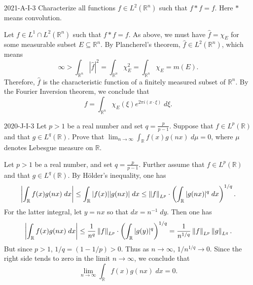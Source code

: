 \documentclass{article}
\begin{document}
	
	\begin{prb}{2021-A-I-3}
		Characterize all functions $f \in L^2(\mathbb{R}^n)$ such that $f \ast f= f$. Here $\ast$ means convolution. 
	\end{prb}
	Let $f \in L^1 \cap L^2(\mathbb{R}^n)$ such that $f \ast f = f$. As above, we must have $\hat{f} = \chi_E$ for some measurable subset $E \subseteq\mathbb{R}^n$. By Plancherel's theorem, $\hat{f} \in L^2(\mathbb{R}^n)$, which means 
	\begin{equation*}
		\infty > \int_{\mathbb{R}^n}|\hat{f}|^2 = \int_{\mathbb{R}^n}\chi_E^2 = \int_{\mathbb{R}^n}\chi_E = m(E). 
	\end{equation*}
	Therefore, $\hat{f}$ is the characteristic function of a finitely measured subset of $\mathbb{R}^n$. By the Fourier Inversion theorem, we conclude that
	\begin{equation*}
		f = \int_{\mathbb{R}^n}\chi_E(\xi)e^{2\pi i (x \cdot \xi)}\;d\xi. 
	\end{equation*}
	
	\begin{prb}{2020-J-I-3}
		Let $p >1$ be a real number and set $q = \frac{p}{p - 1}$. Suppose that $f \in L^{p}(\mathbb{R})$ and that $g \in L^q(\mathbb{R})$. Prove that $\lim_{n \to \infty}\int_{\mathbb{R}}f(x)g(nx)\;d\mu = 0$, where $\mu$ denotes Lebesgue measure on $\mathbb{R}$. 
	\end{prb}
	Let $p > 1$ be a real number, and set $q = \frac{p}{p - 1}$. Further assume that $f \in L^p(\mathbb{R})$ and that $g \in L^q(\mathbb{R})$. By H\"older's inequality, one has 
	\begin{equation*}
		\left| \int_{\mathbb{R}}f(x)g(nx)\;dx \right| \leq \int_{\mathbb{R}}|f(x)||g(nx)|\;dx \leq \left\Vert f \right\Vert_{L^p} \cdot \left(\int_{\mathbb{R}}|g(nx)|^q\;dx\right)^{1/q}. 
	\end{equation*}
	For the latter integral, let $y = nx$ so that $dx = n^{-1}\;dy$. Then one has 
	\begin{equation*}
		\left| \int_{\mathbb{R}}f(x)g(nx)\;dx \right| \leq \frac{1}{n^q}\left\Vert f \right\Vert_{L^p}\cdot \left(\int_{\mathbb{R}}|g(y)|^{q}\right)^{1/q} = \frac{1}{n^{1/q}}\left\Vert f \right\Vert_{L^p}\left\Vert g \right\Vert_{L^q}. 
	\end{equation*}
	But since $p > 1$, $1/q = (1 - 1/p) > 0$. Thus as $n \to \infty$, $1/n^{1/q} \to 0$. Since the right side tends to zero in the limit $n \to \infty$, we conclude that 
	\begin{equation*}
		\lim_{n \to \infty}\int_{\mathbb{R}}f(x)g(nx)\;dx = 0. 
	\end{equation*}
	
\end{document}
